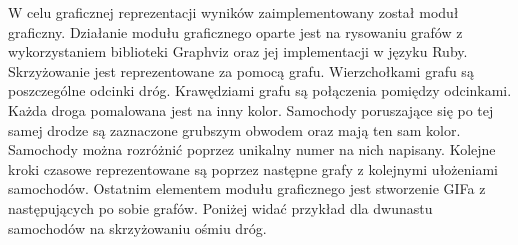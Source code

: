 W celu graficznej reprezentacji wyników zaimplementowany został moduł graficzny.
\newline
\newline
Działanie modułu graficznego oparte jest na rysowaniu grafów z wykorzystaniem biblioteki Graphviz oraz jej implementacji w języku Ruby.
\newline
\newline
Skrzyżowanie jest reprezentowane za pomocą grafu. Wierzchołkami grafu są poszczególne odcinki dróg. Krawędziami grafu są połączenia pomiędzy odcinkami.
\newline
\newline
Każda droga pomalowana jest na inny kolor.
\newline
\newline
Samochody poruszające się po tej samej drodze są zaznaczone grubszym obwodem oraz mają ten sam kolor. Samochody można rozróżnić poprzez unikalny numer na nich napisany.
\newline
\newline
Kolejne kroki czasowe reprezentowane są poprzez następne grafy z kolejnymi ułożeniami samochodów.
\newline
\newline
Ostatnim elementem modułu graficznego jest stworzenie GIFa z następujących po sobie grafów.
\newline
\newline
Poniżej widać przykład dla dwunastu samochodów na skrzyżowaniu ośmiu dróg.
\newline
\newline

